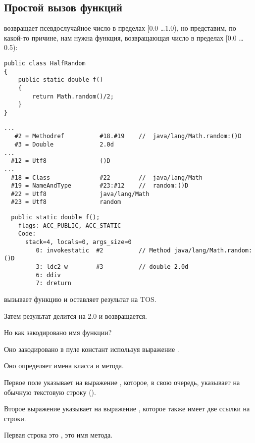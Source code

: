 \subsection{Простой вызов функций}


 возвращает псевдослучайное число в пределах [0.0 \dots 1.0), но представим,
по какой-то причине, нам нужна функция, возвращающая число в пределах [0.0 \dots 0.5):

\begin{lstlisting}[style=customjava]
public class HalfRandom
{ 
	public static double f()
	{
		return Math.random()/2;
	}
}
\end{lstlisting}

\begin{lstlisting}[caption=Constant pool]
...
   #2 = Methodref          #18.#19    //  java/lang/Math.random:()D
   #3 = Double             2.0d
...
  #12 = Utf8               ()D
...
  #18 = Class              #22        //  java/lang/Math
  #19 = NameAndType        #23:#12    //  random:()D
  #22 = Utf8               java/lang/Math
  #23 = Utf8               random
\end{lstlisting}

\begin{lstlisting}
  public static double f();
    flags: ACC_PUBLIC, ACC_STATIC
    Code:
      stack=4, locals=0, args_size=0
         0: invokestatic  #2          // Method java/lang/Math.random:()D
         3: ldc2_w        #3          // double 2.0d
         6: ddiv          
         7: dreturn       
\end{lstlisting}


 вызывает функцию  и оставляет результат на \ac{TOS}.

Затем результат делится на 2.0 и возвращается.

Но как закодировано имя функции?

Оно закодировано в пуле констант используя выражение .

Оно определяет имена класса и метода.

Первое поле  указывает на выражение , которое, в свою очередь,
указывает на обычную текстовую строку ().

Второе выражение  указывает на выражение , которое также
имеет две ссылки на строки.

Первая строка это , это имя метода.

